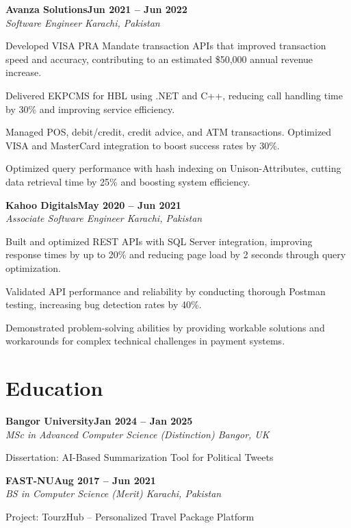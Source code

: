 \documentclass[letterpaper,10pt]{article}
\newcommand{\headingBf}[2]{
  \hspace{10pt}\textbf{#1}\hfill\textbf{#2}\\
}
\newcommand{\headingIt}[2]{
  \hspace{10pt}\textit{#1}\hfill\textit{#2}\\
}
\newenvironment{resume_list}{
  \vspace{-7pt}
  \begin{itemize}[itemsep=-2px, parsep=1pt, leftmargin=30pt]
}{
  \end{itemize}
}
\begin{document}
\headingBf{Avanza Solutions}{Jun 2021 -- Jun 2022}
\headingIt{Software Engineer \hfill Karachi, Pakistan}{}
\begin{resume_list}
    \item Developed VISA PRA Mandate transaction APIs that improved transaction speed and accuracy, contributing to an estimated \$50,000 annual revenue increase.
    \item Delivered EKPCMS for HBL using .NET and C++, reducing call handling time by 30\% and improving service efficiency.
    \item Managed POS, debit/credit, credit advice, and ATM transactions. Optimized VISA and MasterCard integration to boost success rates by 30\%.
    \item Optimized query performance with hash indexing on Unison-Attributes, cutting data retrieval time by 25\% and boosting system efficiency.
\end{resume_list}

\headingBf{Kahoo Digitals}{May 2020 -- Jun 2021}
\headingIt{Associate Software Engineer \hfill Karachi, Pakistan}{}
\begin{resume_list}
    \item Built and optimized REST APIs with SQL Server integration, improving response times by up to 20\% and reducing page load by 2 seconds through query optimization.
    \item Validated API performance and reliability by conducting thorough Postman testing, increasing bug detection rates by 40\%.
    \item Demonstrated problem-solving abilities by providing workable solutions and workarounds for complex technical challenges in payment systems.
\end{resume_list}

\section{Education}

\headingBf{Bangor University}{Jan 2024 -- Jan 2025}
\headingIt{MSc in Advanced Computer Science (Distinction) \hfill Bangor, UK}{}
\begin{resume_list}
    \item Dissertation: AI-Based Summarization Tool for Political Tweets
\end{resume_list}

\headingBf{FAST-NU}{Aug 2017 -- Jun 2021}
\headingIt{BS in Computer Science (Merit) \hfill Karachi, Pakistan}{}
\begin{resume_list}
    \item Project: TourzHub -- Personalized Travel Package Platform
\end{resume_list}
\end{document}
